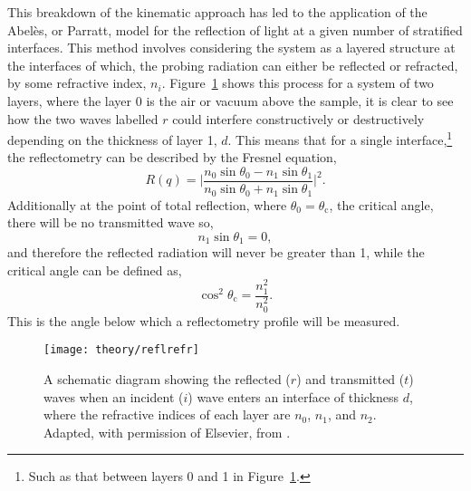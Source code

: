 This breakdown of the kinematic approach has led to the application of the Abel\`{e}s, or Parratt, model for the reflection of light at a given number of stratified interfaces.
This method involves considering the system as a layered structure at the interfaces of which, the probing radiation can either be reflected or refracted, by some refractive index, $n_i$.
Figure~\ref{fig:reflrefr} shows this process for a system of two layers, where the layer \num{0} is the air or vacuum above the sample, it is clear to see how the two waves labelled $r$ could interfere constructively or destructively depending on the thickness of layer \num{1}, $d$.
This means that for a single interface,\footnote{Such as that between layers \num{0} and \num{1} in Figure~\ref{fig:reflrefr}.} the reflectometry can be described by the Fresnel equation,
%
\begin{equation}
    R(q) = \bigg| \frac{n_0\sin{\theta_0} - n_1\sin{\theta_1}}{n_0\sin{\theta_0} + n_1\sin{\theta_1}} \bigg|^2.
\end{equation}
%
Additionally at the point of total reflection, where $\theta_0 = \theta_{\text{c}}$, the critical angle, there will be no transmitted wave so,
%
\begin{equation}
    n_1\sin{\theta_1} = 0,
\end{equation}
%
and therefore the reflected radiation will never be greater than 1, while the critical angle can be defined as,
%
\begin{equation}
    \cos^2{\theta_{\text{c}}} = \frac{n_1^2}{n_0^2}.
\end{equation}
%
This is the angle below which a reflectometry profile will be measured.
%
\begin{figure}[t]
    \centering
    \texttt{[image: theory/reflrefr]}
    \caption{A schematic diagram showing the reflected ($r$) and transmitted ($t$) waves when an incident ($i$) wave enters an interface of thickness $d$, where the refractive indices of each layer are $n_0$, $n_1$, and $n_2$. Adapted, with permission of Elsevier, from \cite{foglia_studies_2015}.}
    \label{fig:reflrefr}
\end{figure}
%

